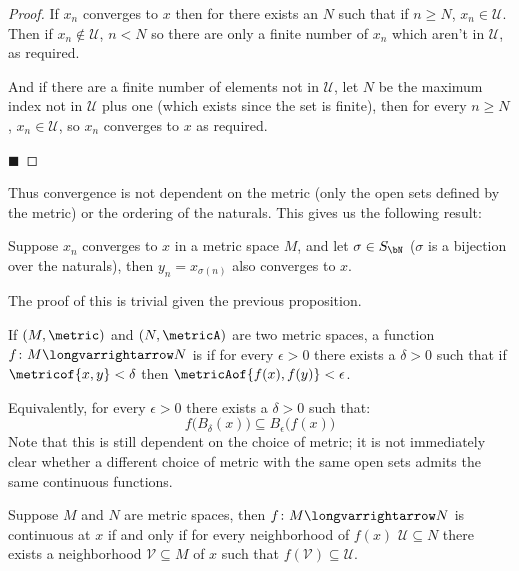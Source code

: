 \documentclass[10pt]{article}
\def\mU{\mathcal{U}}
\def\mV{\mathcal{V}}
\begin{document}
\begin{proof}

    If $x_n$ converges to $x$ then for there exists an $N$ such that if $n\geq N$, $x_n\in\mU$.
    Then if $x_n\notin\mU$, $n<N$ so there are only a finite number of $x_n$ which aren't in $\mU$, as required.

    And if there are a finite number of elements not in $\mU$, let $N$ be the maximum index not in $\mU$ plus one (which exists since the set is finite), then for every $n\geq N$, $x_n\in\mU$, so $x_n$
    converges to $x$ as required.

    \hfill$\blacksquare$

\end{proof}

Thus convergence is not dependent on the metric (only the open sets defined by the metric) or the ordering of the naturals.
This gives us the following result:

\begin{prop*}

    Suppose $x_n$ converges to $x$ in a metric space $M$, and let $\sigma\in S_\bN$ ($\sigma$ is a bijection over the naturals), then $y_n=x_{\sigma(n)}$ also converges to $x$.

\end{prop*}

The proof of this is trivial given the previous proposition.

\begin{defn*}

    If $(M,\metric)$ and $(N,\metricA)$ are two metric spaces, a function $f\colon M\longvarrightarrow N$ is  if for every $\epsilon>0$ there exists a $\delta>0$ such that if
    $\metricof{x,y}<\delta$ then $\metricAof{f(x),f(y)}<\epsilon$.

\end{defn*}

Equivalently, for every $\epsilon>0$ there exists a $\delta>0$ such that:
\[ f\bigl(B_\delta(x)\bigr) \subseteq B_\epsilon\bigl(f(x)\bigr) \]
Note that this is still dependent on the choice of metric; it is not immediately clear whether a different choice of metric with the same open sets admits the same continuous functions.

\begin{prop*}

    Suppose $M$ and $N$ are metric spaces, then $f\colon M\longvarrightarrow N$ is continuous at $x$ if and only if for every neighborhood of $f(x)$ $\mU\subseteq N$ there exists a neighborhood
    $\mV\subseteq M$ of $x$ such that $f(\mV)\subseteq\mU$.

\end{prop*}
\end{document}
